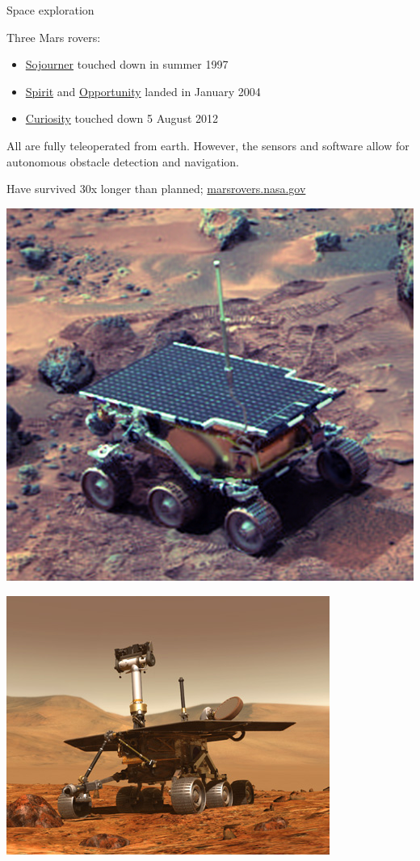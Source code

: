\documentclass[compress]{beamer}
\begin{document}
\begin{frame}{Space exploration}

    \begin{multicols}{2}

        Three Mars rovers:

        \begin{itemize}

            \item
                \href{https://en.wikipedia.org/wiki/Sojourner_(rover)}{Sojourner}
                touched down in summer 1997

            \item \href{http://en.wikipedia.org/wiki/Spirit_rover}{Spirit} and
                \href{http://en.wikipedia.org/wiki/Opportunity_rover}{Opportunity}
                landed in January 2004

            \item \href{http://mars.jpl.nasa.gov/msl/mission/overview/}{Curiosity}
                touched down 5 August 2012

        \end{itemize}

        All are fully teleoperated from earth.  However, the sensors
        and software allow for autonomous obstacle detection and
        navigation.

        Have survived 30x longer than planned;
        \href{http://marsrovers.nasa.gov/}{marsrovers.nasa.gov}

        \begin{center}
            \includegraphics[width=0.6\linewidth]{space-robot-sojourner}

            \includegraphics[width=0.6\linewidth]{space-robot-spirit}


\end{center}
\end{multicols}
\end{frame}
\end{document}
